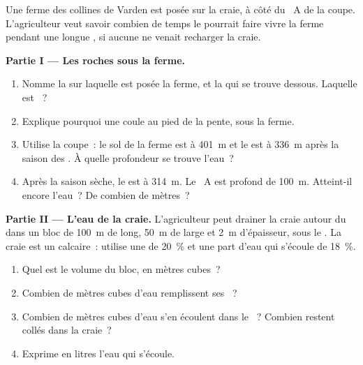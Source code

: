 \begin{problem}
\label{pb:g6:water-underground:1}
Une ferme des collines de Varden est posée sur la craie, à côté du
~A de la coupe. L'agriculteur veut savoir combien de temps le 
pourrait faire vivre la ferme pendant une longue , si aucune
 ne venait recharger la craie.

\medskip
\noindent\textbf{Partie I --- Les roches sous la ferme.}
\begin{enumerate}
  \item Nomme la  sur laquelle est posée la ferme, et la  qui se
        trouve dessous. Laquelle est ~?
  \item Explique pourquoi une  coule au pied de la pente, sous la
        ferme.
  \item Utilise la coupe~: le sol de la ferme est à 401~m et le  est à 336~m après la saison des . À quelle profondeur
        se trouve l'eau~?
  \item Après la saison sèche, le  est à 314~m. Le
        ~A est profond de 100~m. Atteint-il encore l'eau~? De combien
        de mètres~?
\end{enumerate}

\medskip
\noindent\textbf{Partie II --- L'eau de la craie.}
L'agriculteur peut drainer la craie autour du  dans un bloc de 100~m
de long, 50~m de large et 2~m d'épaisseur, sous le . La
craie est un calcaire~: utilise une  de 20~\% et une part d'eau qui
s'écoule de 18~\%.
\begin{enumerate}[resume]
  \item Quel est le volume du bloc, en mètres cubes~?
  \item Combien de mètres cubes d'eau remplissent ses ~?
  \item Combien de mètres cubes d'eau s'en écoulent dans le ~?
        Combien restent collés dans la craie~?
  \item Exprime en litres l'eau qui s'écoule.
\end{enumerate}


\end{problem}
